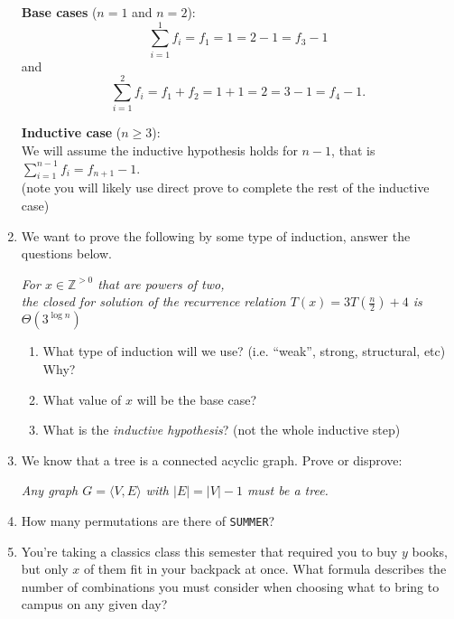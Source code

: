 \documentclass[11pt, oneside]{article}   	%
\newcommand{\ints}{\mathbb{Z}}
\begin{document}
\begin{enumerate}
\textbf{Base cases} ($n=1$ and $n=2$):
 \[\sum_{i=1}^{1}f_i = f_1 = 1 = 2 - 1 = f_{3}-1\] and
 \[\sum_{i=1}^{2}f_i = f_1 + f_2 = 1 + 1 = 2 = 3 - 1 = f_{4}-1.\]
 
\textbf{Inductive case} ($n\ge 3$):\\
\hspace*{3em}We will assume the inductive hypothesis holds for $n-1$, that is $\sum_{i=1}^{n-1}f_i = f_{n+1}-1$. \\
\hspace*{3em} (note you will likely use direct prove to complete the rest of the inductive case)
 \vspace{16em}
 
 \clearpage
\item We want to prove the following by some type of induction, answer the questions below. 
\begin{center}
\textit{
For $x\in\ints^{>0}$ that are powers of two,\\
the closed for solution of the recurrence relation $T(x) = 3T(\frac{n}{2}) + 4$
is $\Theta\left(3^{\log n}\right)$
}
\end{center}
\begin{enumerate}
\item What type of induction will we use? (i.e. ``weak'', strong, structural, etc) Why?\vspace{3em}
\item What value of $x$ will be the base case? \vspace{3em}
\item What is the \textit{inductive hypothesis}? (not the whole inductive step)\vspace{3em}
\end{enumerate}


\item We know that a tree is a connected acyclic graph. 
Prove or disprove: 
\begin{center}
\textit{Any graph $G=\langle V,E\rangle$ with $|E|=|V|-1$ 
must be a tree. }
\end{center}
\vspace{5em}


\item How many permutations are there of \texttt{SUMMER}? \vspace{5em}

\item You're taking a classics class this semester that required you to buy $y$ books, 
but only $x$ of them fit in your backpack at once. 
What formula describes the number of combinations 
you must consider when choosing what to bring to campus on any given day? \vspace{5em}


\end{enumerate}
\end{document}
